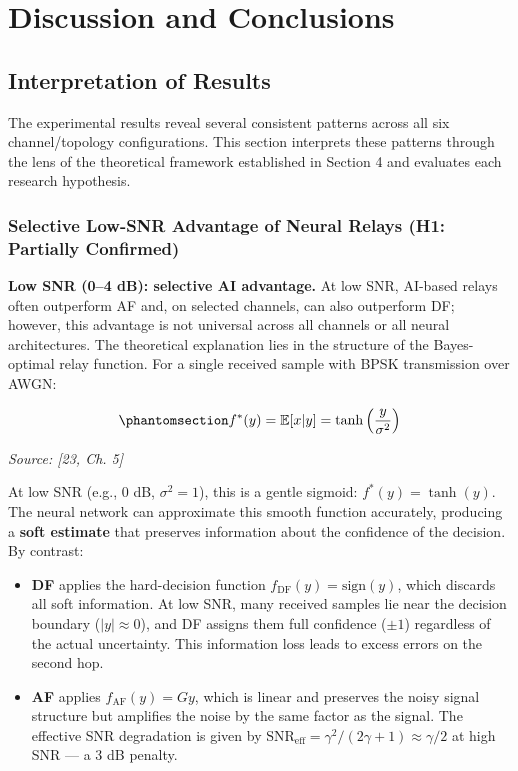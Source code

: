 \chapter{Discussion and Conclusions}\label{sec:discussion-and-conclusions}

\section{Interpretation of Results}\label{sec:interpretation-of-results}

The experimental results reveal several consistent patterns across all six channel/topology configurations. This section interprets these patterns through the lens of the theoretical framework established in Section 4 and evaluates each research hypothesis.

\subsection{Selective Low-SNR Advantage of Neural Relays (H1: Partially Confirmed)}\label{sec:selective-low-snr-advantage-of-neural-relays-h1-partially-confirmed}

\textbf{Low SNR (0--4 dB): selective AI advantage.} At low SNR, AI-based relays often outperform AF and, on selected channels, can also outperform DF; however, this advantage is not universal across all channels or all neural architectures. The theoretical explanation lies in the structure of the Bayes-optimal relay function. For a single received sample with BPSK transmission over AWGN:

\begin{equation}\protect\phantomsection\label{eq:optimal-denoiser-relay}{f^*(y) = \mathbb{E}[x | y] = \tanh\left(\frac{y}{\sigma^2}\right)
}\end{equation} \par{\small\textit{Source: [23, Ch. 5]}}

At low SNR (e.g., 0 dB, \(\sigma^2 = 1\)), this is a gentle sigmoid: \(f^*(y) = \tanh(y)\). The neural network can approximate this smooth function accurately, producing a \textbf{soft estimate} that preserves information about the confidence of the decision. By contrast:

\begin{itemize}
\item
  \textbf{DF} applies the hard-decision function \(f_{\text{DF}}(y) = \text{sign}(y)\), which discards all soft information. At low SNR, many received samples lie near the decision boundary (\(|y| \approx 0\)), and DF assigns them full confidence (\(\pm 1\)) regardless of the actual uncertainty. This information loss leads to excess errors on the second hop.
\item
  \textbf{AF} applies \(f_{\text{AF}}(y) = Gy\), which is linear and preserves the noisy signal structure but amplifies the noise by the same factor as the signal. The effective SNR degradation is given by \(\text{SNR}_{\text{eff}} = \gamma^2 / (2\gamma + 1) \approx \gamma/2\) at high SNR --- a 3 dB penalty.
\end{itemize}

